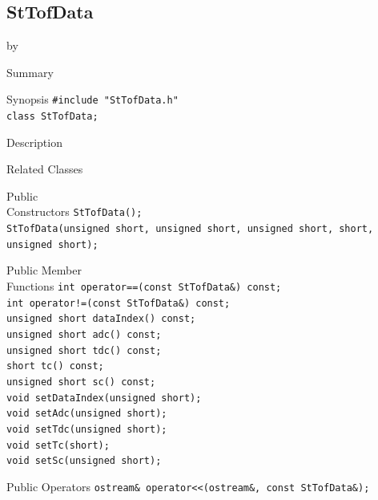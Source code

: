 \documentclass[twoside]{article}
\newcommand{\entrylabel}[1]{\mbox{\textbf{{#1}}}\hfil}%
\newenvironment{entry}
{\begin{list}{}%
    {\renewcommand{\makelabel}{\entrylabel}%
     \setlength{\labelwidth}{90pt}%
     \setlength{\leftmargin}{\labelwidth}
     \advance\leftmargin by \labelsep%
      }%
    }%
  {\end{list}}
\newcommand{\Entrylabel}[1]%
{\raisebox{0pt}[1ex][0pt]{\makebox[\labelwidth][l]%
    {\parbox[t]{\labelwidth}{\hspace{0pt}\textbf{{#1}}}}}}
\newenvironment{Entry}%
{\renewcommand{\entrylabel}{\Entrylabel}\begin{entry}}%
  {\end{entry}}
\begin{document}
\subsection{StTofData}
\label{sec:StTofData}
\begin{Entry}
\item[Summary]
\item[Synopsis]
    \verb+#include "StTofData.h"+\\
    \verb+class StTofData;+\\
\item[Description]
\item[Related Classes]
\item[Public\\ Constructors]
    \verb+StTofData();+\\
    \verb+StTofData(unsigned short, unsigned short, unsigned short, short, unsigned short);+\\
\item[Public Member\\ Functions]
    \verb+int operator==(const StTofData&) const;+\\
    \verb+int operator!=(const StTofData&) const;+\\
    \verb+unsigned short dataIndex() const;+\\
    \verb+unsigned short adc() const;+\\
    \verb+unsigned short tdc() const;+\\
    \verb+short tc() const;+\\
    \verb+unsigned short sc() const;+\\
    \verb+void setDataIndex(unsigned short);+\\
    \verb+void setAdc(unsigned short);+\\
    \verb+void setTdc(unsigned short);+\\
    \verb+void setTc(short);+\\
    \verb+void setSc(unsigned short);+\\
\item[Public Operators]
    \verb+ostream& operator<<(ostream&, const StTofData&);+\\
\end{Entry}
\clearpage
\end{document}
